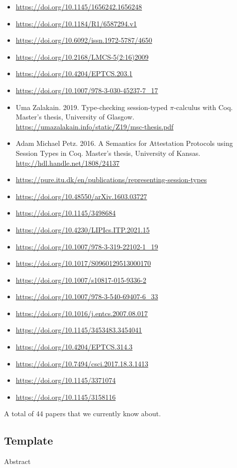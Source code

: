 \begin{itemize}
\item \url{https://doi.org/10.1145/1656242.1656248}
\item \url{https://doi.org/10.1184/R1/6587294.v1}
\item \url{https://doi.org/10.6092/issn.1972-5787/4650}
\item \url{https://doi.org/10.2168/LMCS-5(2:16)2009}
\item \url{https://doi.org/10.4204/EPTCS.203.1}
\item \url{https://doi.org/10.1007/978-3-030-45237-7_17}
\item Uma Zalakain. 2019. Type-checking session-typed $\pi$-calculus with Coq. Master's thesis, University of Glasgow. \url{https://umazalakain.info/static/Z19/msc-thesis.pdf}
\item Adam Michael Petz. 2016. A Semantics for Attestation Protocols using Session Types in Coq. Master's thesis, University of Kansas. \url{http://hdl.handle.net/1808/24137}
\item \url{https://pure.itu.dk/en/publications/representing-session-types}
\item \url{https://doi.org/10.48550/arXiv.1603.03727}
\item \url{https://doi.org/10.1145/3498684}
\item \url{https://doi.org/10.4230/LIPIcs.ITP.2021.15}
\item \url{https://doi.org/10.1007/978-3-319-22102-1_19}
\item \url{https://doi.org/10.1017/S0960129513000170}
\item \url{https://doi.org/10.1007/s10817-015-9336-2}
\item \url{https://doi.org/10.1007/978-3-540-69407-6_33}
\item \url{https://doi.org/10.1016/j.entcs.2007.08.017}
\item \url{https://doi.org/10.1145/3453483.3454041}
\item \url{https://doi.org/10.4204/EPTCS.314.3}
\item \url{https://doi.org/10.7494/csci.2017.18.3.1413}
\item \url{https://doi.org/10.1145/3371074}
\item \url{https://doi.org/10.1145/3158116}
\end{itemize}

A total of 44 papers that we currently know about.

\subsection{Template}
Abstract

